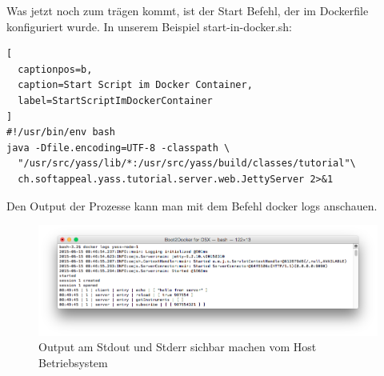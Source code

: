 Was jetzt noch zum trägen kommt, ist der Start Befehl, der im Dockerfile
konfiguriert wurde. In unserem Beispiel start-in-docker.sh:
\\

\begin{lstlisting}[
  captionpos=b,
  caption=Start Script im Docker Container,
  label=StartScriptImDockerContainer
]
#!/usr/bin/env bash
java -Dfile.encoding=UTF-8 -classpath \
  "/usr/src/yass/lib/*:/usr/src/yass/build/classes/tutorial"\
  ch.softappeal.yass.tutorial.server.web.JettyServer 2>&1
\end{lstlisting}

Den Output der Prozesse kann man mit dem Befehl docker logs anschauen.

\begin{figure}[htbp]
  \begin{center}
    \includegraphics[width=1.0\textwidth]{./images/logOutput.png}
    \caption{Output am Stdout und Stderr sichbar machen vom Host Betriebsystem}
    \label{img:logOutput}
  \end{center}
\end{figure}





